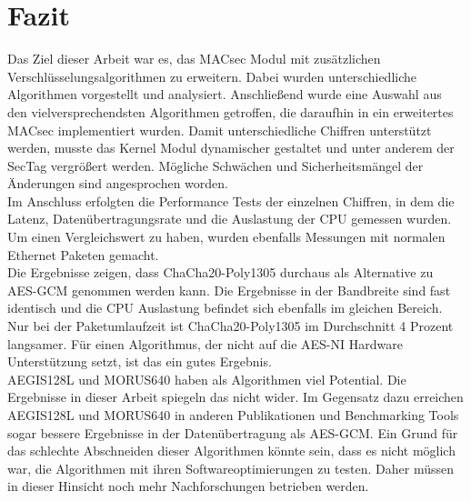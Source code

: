 \chapter{Fazit}
\label{sec:Fazit}
Das Ziel dieser Arbeit war es, das \gls{MACsec} Modul mit zusätzlichen Verschlüsselungsalgorithmen zu erweitern. Dabei wurden unterschiedliche Algorithmen vorgestellt und analysiert. Anschließend wurde eine Auswahl aus den vielversprechendsten Algorithmen getroffen, die daraufhin in ein erweitertes MACsec implementiert wurden. Damit unterschiedliche Chiffren unterstützt werden, musste das Kernel Modul dynamischer gestaltet und unter anderem der SecTag vergrößert werden. Mögliche Schwächen und Sicherheitsmängel der Änderungen sind angesprochen worden. \\
Im Anschluss erfolgten die Performance Tests der einzelnen Chiffren, in dem die Latenz, Datenübertragungsrate und die Auslastung der \gls{CPU} gemessen wurden. Um einen Vergleichswert zu haben, wurden ebenfalls Messungen mit normalen Ethernet Paketen gemacht.\\
Die Ergebnisse zeigen, dass ChaCha20-Poly1305 durchaus als Alternative zu \gls{AES-GCM} genommen werden kann. Die Ergebnisse in der Bandbreite sind fast identisch und die CPU Auslastung befindet sich ebenfalls im gleichen Bereich. Nur bei der Paketumlaufzeit ist ChaCha20-Poly1305 im Durchschnitt 4 Prozent langsamer. Für einen Algorithmus, der nicht auf die \gls{AES-NI} Hardware Unterstützung setzt, ist das ein gutes Ergebnis.\\
AEGIS128L und MORUS640 haben als Algorithmen viel Potential. Die Ergebnisse in dieser Arbeit spiegeln das nicht wider. Im Gegensatz dazu erreichen AEGIS128L und MORUS640 in anderen Publikationen\cite{Ankele2016SoftwareBO} und Benchmarking Tools \cite{bernstein2009supercop} sogar bessere Ergebnisse in der Datenübertragung als \gls{AES-GCM}. Ein Grund für das schlechte Abschneiden dieser Algorithmen könnte sein, dass es nicht möglich war, die Algorithmen mit ihren Softwareoptimierungen zu testen. Daher müssen in dieser Hinsicht noch mehr Nachforschungen betrieben werden.





